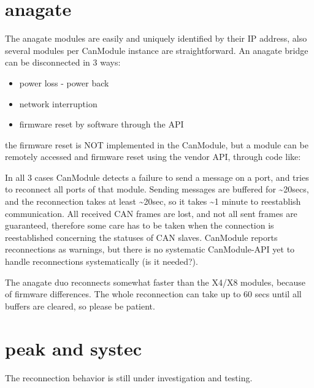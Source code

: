 \documentclass[letterpaper,10pt,english]{sphinxmanual}
\begin{document}
\section{anagate}
\label{\detokenize{connection:anagate}}
The anagate modules are easily and uniquely identified by their IP address, also several modules
per CanModule instance are straightforward. An anagate bridge can be disconnected in 3 ways:
\begin{itemize}
\item {} 
power loss - power back

\item {} 
network interruption

\item {} 
firmware reset by software through the API

\end{itemize}

the firmware reset is NOT implemented in the CanModule, but a module can be remotely accessed and
firmware reset using the vendor API, through code like:

\begin{sphinxVerbatim}[commandchars=\\\{\}]
    
      
\end{sphinxVerbatim}

In all 3 cases CanModule detects a failure to send a message on a port, and tries to reconnect
all ports of that module. Sending messages are buffered for \textasciitilde{}20secs, and the reconnection
takes at least \textasciitilde{}20sec, so it takes \textasciitilde{}1 minute to reestablish communication. All received CAN frames
are lost, and not all sent frames are guaranteed, therefore some care has to be taken when the
connection is reestablished concerning the statuses of CAN slaves. CanModule reports reconnections
as warnings, but there is no systematic CanModule-API yet to handle reconnections
systematically (is it needed?).

The anagate duo reconnects somewhat faster than the X4/X8 modules, because of firmware differences.
The whole reconnection can take up to 60 secs until all buffers are cleared, so please be patient.


\section{peak and systec}
\label{\detokenize{connection:peak-and-systec}}
The reconnection behavior is still under investigation and testing.
\end{document}
